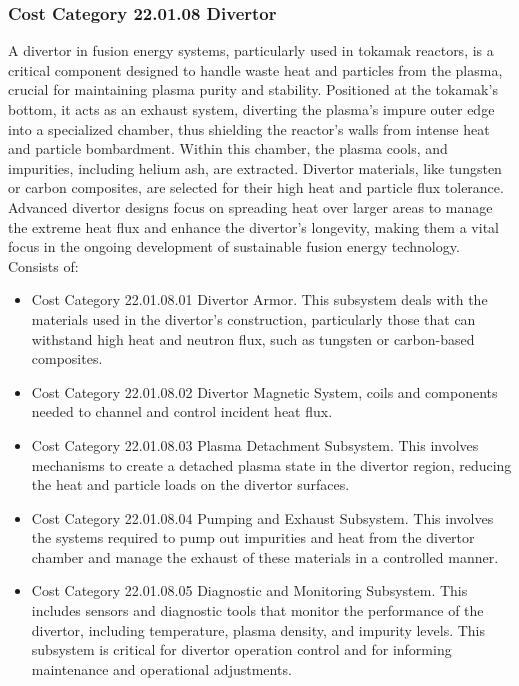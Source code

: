 
\subsubsection*{Cost Category 22.01.08 Divertor}

A divertor in fusion energy systems, particularly used in tokamak reactors, is a critical component designed to handle waste heat and particles from the plasma, crucial for maintaining plasma purity and stability. Positioned at the tokamak's bottom, it acts as an exhaust system, diverting the plasma's impure outer edge into a specialized chamber, thus shielding the reactor's walls from intense heat and particle bombardment. Within this chamber, the plasma cools, and impurities, including helium ash, are extracted. Divertor materials, like tungsten or carbon composites, are selected for their high heat and particle flux tolerance. Advanced divertor designs focus on spreading heat over larger areas to manage the extreme heat flux and enhance the divertor's longevity, making them a vital focus in the ongoing development of sustainable fusion energy technology.\\

Consists of:

\begin{itemize}
    \item Cost Category 22.01.08.01 Divertor Armor. This subsystem deals with the materials used in the divertor's construction, particularly those that can withstand high heat and neutron flux, such as tungsten or carbon-based composites.

\item Cost Category 22.01.08.02 Divertor Magnetic System, coils and components needed to channel and control incident heat flux.

\item  Cost Category 22.01.08.03 Plasma Detachment Subsystem. This involves mechanisms to create a detached plasma state in the divertor region, reducing the heat and particle loads on the divertor surfaces. 


\item Cost Category 22.01.08.04 Pumping and Exhaust Subsystem. This involves the systems required to pump out impurities and heat from the divertor chamber and manage the exhaust of these materials in a controlled manner.

\item Cost Category 22.01.08.05 Diagnostic and Monitoring Subsystem. This includes sensors and diagnostic tools that monitor the performance of the divertor, including temperature, plasma density, and impurity levels. This subsystem is critical for divertor operation control and for informing maintenance and operational adjustments.
\end{itemize}


